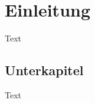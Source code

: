 \chapter{Einleitung}
\label{Kapitel:Einleitung}
Text


\section{Unterkapitel}
\label{Abschnitt:Motivation}


Text
